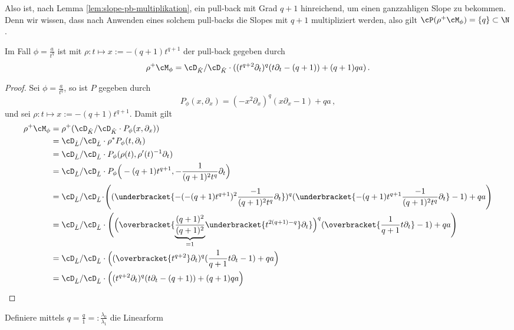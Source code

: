 Also ist, nach Lemma \ref{lem:slope-pb-multiplikation}, ein pull-back mit Grad
$q+1$ hinreichend, um einen ganzzahligen Slope zu bekommen. Denn wir wissen,
dass nach Anwenden eines solchem pull-backs die Slopes mit ${q+1}$
multipliziert werden, also gilt $\cP(\rho^+\cM_\phi)=\{q\}\subset\N$.
\begin{lem}
Im Fall $\phi=\frac{a}{t^{q}}$ ist mit $\rho:t\mapsto x:=-(q+1) t^{q+1}$ der
pull-back gegeben durch
\[
\rho^+\cM_\phi =\cD_{\hat K}/\cD_{\hat K} \cdot((t^{q+2}\partial_t)^{q}
    (t\partial_t-(q+1))+(q+1)qa) \,.
\]
\end{lem}
\begin{proof}
Sei $\phi=\frac{a}{t^{q}}$, so ist $P$ gegeben durch
\[
P_{\phi}(x,\partial_x) =(-x^2\partial_x)^{q} (x\partial_x-1)+qa \,,
\]
und sei $\rho:t\mapsto x:=-(q+1) t^{q+1}$. Damit gilt
\begin{align*}
\rho^+\cM_\phi &= \rho^+(\cD_{\hat K}/\cD_{\hat K}\cdot P_\phi(x,\partial_x))\\
  &=\cD_{\hat L}/\cD_{\hat L}\cdot\rho^*P_\phi(t,\partial_t)\\
  &=\cD_{\hat L}/\cD_{\hat L}\cdot P_\phi(\rho(t),\rho'(t)^{-1}\partial_t)\\
  &=\cD_{\hat L}/\cD_{\hat L}
    \cdot P_\phi\Big(-(q+1) t^{q+1},-\frac{1}{(q+1)^2t^q}\partial_t\Big)\\
  &=\cD_{\hat L}/\cD_{\hat L} \!\cdot\! \Bigg((\underbracket{
    -(-(q+1) t^{q+1})^2\frac{-1}{(q+1)^2t^{q}}\partial_t})^{q}
    (\underbracket{-(q+1) t^{q+1}\frac{-1}{(q+1)^2t^{q}}\partial_t}-1)
    +qa\Bigg)\\
  &=\cD_{\hat L}/\cD_{\hat L}
    \cdot\Bigg(\Big(\overbracket{
      \underset{=1}{\underbrace{\frac{(q+1)^2}{(q+1)^2}}}
      \underbracket{t^{2(q+1)-q}}\partial_t}\Big)^{q}
    (\overbracket{\frac{1}{q+1}t\partial_t}-1)+qa\Bigg)\\
  &=\cD_{\hat L}/\cD_{\hat L}
    \cdot\Big((\overbracket{t^{q+2}}\partial_t)^{q}
    (\frac{1}{q+1}t\partial_t-1)+qa\Big)\\
  &=\cD_{\hat L}/\cD_{\hat L}
    \cdot\Big((t^{q+2}\partial_t)^{q}
    (t\partial_t-(q+1))+(q+1)qa\Big)
\end{align*}
\end{proof}
\begin{comment}
\begin{cor}
Ordnung vom pull-back ist $0$
\end{cor}
\end{comment}
Definiere mittels
$q=\frac{q}{1}=:\frac{\lambda_0}{\lambda_1}$ die  Linearform
